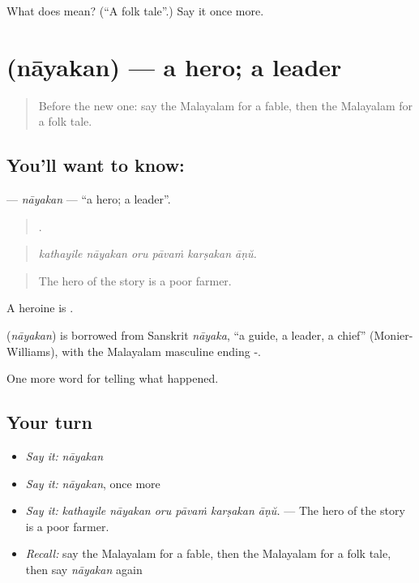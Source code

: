 \begin{tcolorbox}[breakable,colback=teal!4,colframe=teal!35!black,title={Before you move on}]
What does  mean? (\textquotedblleft{}A folk tale\textquotedblright{}.) Say it once more.
\end{tcolorbox}
\section[\texorpdfstring{\ml{നായകൻ} (nāyakan)}{നായകൻ (nāyakan)}]{ (nāyakan) — a hero; a leader}

\label{lesson:ML-C402-nayakan}



\begin{quote}
Before the new one: say the Malayalam for a fable, then the Malayalam for a folk tale.
\end{quote}

\subsection*{You'll want to know: }
\textbf{} — \emph{nāyakan} — \textquotedblleft{}a hero; a leader\textquotedblright{}.

\begin{quote}
     .
\end{quote}

\begin{quote}
\emph{kathayile nāyakan oru pāvaṁ karṣakan āṇŭ.}
\end{quote}

\begin{quote}
The hero of the story is a poor farmer.
\end{quote}

A heroine is .

\begin{cousinweb}
\textbf{} (\emph{nāyakan}) is borrowed from Sanskrit \emph{nāyaka}, \textquotedblleft{}a guide, a leader, a chief\textquotedblright{} (Monier-Williams), with the Malayalam masculine ending -.
\end{cousinweb}

\begin{grammarlens}[title={What you've built}]
One more word for telling what happened.
\end{grammarlens}

\subsection*{Your turn}
\begin{itemize}
\raggedright
  \item \emph{Say it:} \emph{nāyakan}
  \item \emph{Say it:} \emph{nāyakan}, once more
  \item \emph{Say it:} \emph{kathayile nāyakan oru pāvaṁ karṣakan āṇŭ.} — The hero of the story is a poor farmer.
  \item \emph{Recall:} say the Malayalam for a fable, then the Malayalam for a folk tale, then say \emph{nāyakan} again
\end{itemize}


